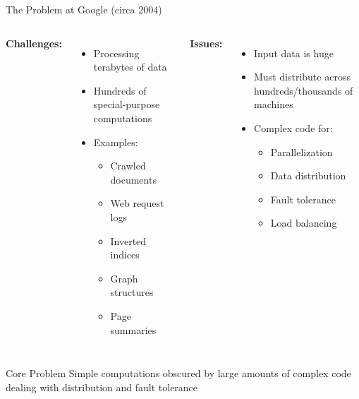 \documentclass[aspectratio=169]{beamer}
\begin{document}
\begin{frame}{The Problem at Google (circa 2004)}
\begin{columns}
\textbf{Challenges:}
\begin{itemize}
    \item Processing \alert{terabytes} of data
    \item Hundreds of special-purpose computations
    \item Examples:
    \begin{itemize}
        \item Crawled documents
        \item Web request logs
        \item Inverted indices
        \item Graph structures
        \item Page summaries
    \end{itemize}
\end{itemize}

\textbf{Issues:}
\begin{itemize}
    \item Input data is \alert{huge}
    \item Must distribute across \alert{hundreds/thousands} of machines
    \item Complex code for:
    \begin{itemize}
        \item Parallelization
        \item Data distribution
        \item Fault tolerance
        \item Load balancing
    \end{itemize}
\end{itemize}
\end{columns}

\vspace{0.5cm}
\begin{alertblock}{Core Problem}
Simple computations obscured by large amounts of complex code dealing with distribution and fault tolerance
\end{alertblock}
\end{frame}
\end{document}
